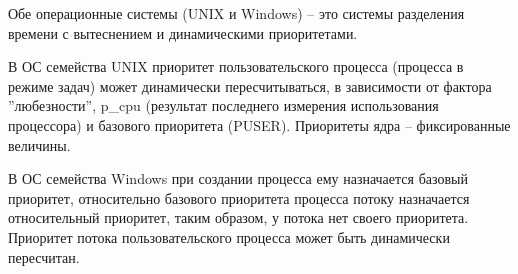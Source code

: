 Обе операционные системы (UNIX и Windows) -- это системы разделения времени с вытеснением и динамическими приоритетами.

В ОС семейства UNIX приоритет пользовательского процесса (процесса в режиме задач) может динамически пересчитываться, в зависимости от фактора ''любезности'', p\_cpu (результат последнего измерения использования процессора) и базового приоритета (PUSER). Приоритеты ядра -- фиксированные величины.

В ОС семейства Windows при создании процесса ему назначается базовый приоритет, относительно базового приоритета процесса потоку назначается относительный приоритет, таким образом, у потока нет своего приоритета. Приоритет потока пользовательского процесса может быть динамически пересчитан.








